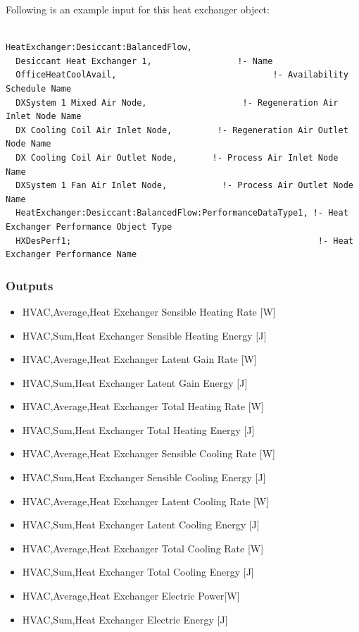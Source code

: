 Following is an example input for this heat exchanger object:

\begin{lstlisting}

HeatExchanger:Desiccant:BalancedFlow,
  Desiccant Heat Exchanger 1,                 !- Name
  OfficeHeatCoolAvail,                               !- Availability Schedule Name
  DXSystem 1 Mixed Air Node,                   !- Regeneration Air Inlet Node Name
  DX Cooling Coil Air Inlet Node,         !- Regeneration Air Outlet Node Name
  DX Cooling Coil Air Outlet Node,       !- Process Air Inlet Node Name
  DXSystem 1 Fan Air Inlet Node,           !- Process Air Outlet Node Name
  HeatExchanger:Desiccant:BalancedFlow:PerformanceDataType1, !- Heat Exchanger Performance Object Type
  HXDesPerf1;                                                 !- Heat Exchanger Performance Name
\end{lstlisting}

\subsubsection{Outputs}\label{outputs-2-010}

\begin{itemize}
\item
  HVAC,Average,Heat Exchanger Sensible Heating Rate {[}W{]}
\item
  HVAC,Sum,Heat Exchanger Sensible Heating Energy {[}J{]}
\item
  HVAC,Average,Heat Exchanger Latent Gain Rate {[}W{]}
\item
  HVAC,Sum,Heat Exchanger Latent Gain Energy {[}J{]}
\item
  HVAC,Average,Heat Exchanger Total Heating Rate {[}W{]}
\item
  HVAC,Sum,Heat Exchanger Total Heating Energy {[}J{]}
\item
  HVAC,Average,Heat Exchanger Sensible Cooling Rate {[}W{]}
\item
  HVAC,Sum,Heat Exchanger Sensible Cooling Energy {[}J{]}
\item
  HVAC,Average,Heat Exchanger Latent Cooling Rate {[}W{]}
\item
  HVAC,Sum,Heat Exchanger Latent Cooling Energy {[}J{]}
\item
  HVAC,Average,Heat Exchanger Total Cooling Rate {[}W{]}
\item
  HVAC,Sum,Heat Exchanger Total Cooling Energy {[}J{]}
\item
  HVAC,Average,Heat Exchanger Electric Power{[}W{]}
\item
  HVAC,Sum,Heat Exchanger Electric Energy {[}J{]}
\end{itemize}

